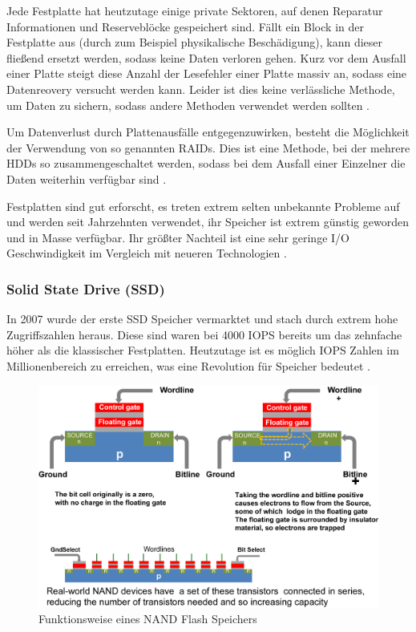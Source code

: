 Jede Festplatte hat heutzutage einige private Sektoren, auf denen Reparatur Informationen und Reserveblöcke gespeichert sind. Fällt ein Block in der Festplatte aus (durch zum Beispiel physikalische Beschädigung), kann dieser fließend ersetzt werden, sodass keine Daten verloren gehen. Kurz vor dem Ausfall einer Platte steigt diese Anzahl der Lesefehler einer Platte massiv an, sodass eine Datenreovery versucht werden kann. Leider ist dies keine verlässliche Methode, um Daten zu sichern, sodass andere Methoden verwendet werden sollten \parencite{kaufmann.2016}.

Um Datenverlust durch Plattenausfälle entgegenzuwirken, besteht die Möglichkeit der Verwendung von so genannten RAIDs. Dies ist eine Methode, bei der mehrere HDDs so zusammengeschaltet werden, sodass bei dem Ausfall einer Einzelner die Daten weiterhin verfügbar sind \parencite{wikibooks.2016}.

Festplatten sind gut erforscht, es treten extrem selten unbekannte Probleme auf und werden seit Jahrzehnten verwendet, ihr Speicher ist extrem günstig geworden und in Masse verfügbar. Ihr größter Nachteil ist eine sehr geringe I/O Geschwindigkeit im Vergleich mit neueren Technologien \parencite{kaufmann.2016}.

\subsubsection{Solid State Drive (SSD)}

In 2007 wurde der erste SSD Speicher vermarktet und stach durch extrem hohe Zugriffszahlen heraus. Diese sind waren bei 4000 \gls{IOPS} bereits um das zehnfache höher als die klassischer Festplatten. Heutzutage ist es möglich IOPS Zahlen im Millionenbereich zu erreichen, was eine Revolution für Speicher bedeutet \parencite{kaufmann.2016}.

\begin{figure}[hbt]
	\centering
	\includegraphics[scale=0.85]{images/flash}
	\caption{Funktionsweise eines NAND Flash Speichers \parencite{kaufmann.2016}}
	\label{fig:flash}
\end{figure}

